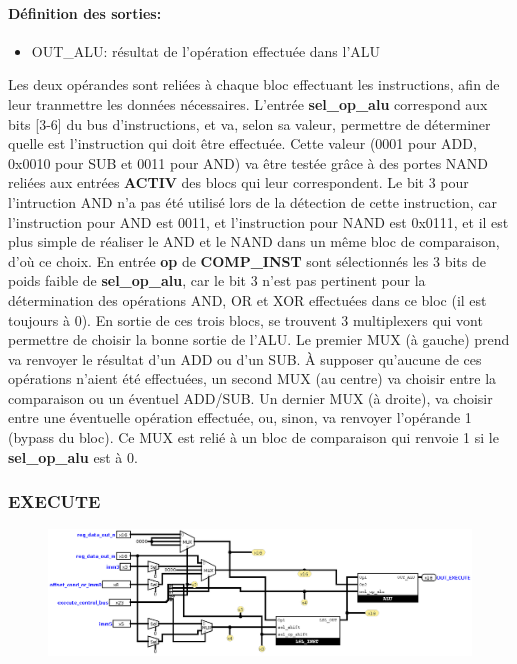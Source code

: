 \documentclass[a4paper]{article} %
\begin{document}
\paragraph{Définition des sorties:}
\begin{itemize}
    \item     OUT\_ALU: résultat de l'opération effectuée dans l'ALU
\end{itemize}
\medskip
Les deux opérandes sont reliées à chaque bloc effectuant les instructions, afin de leur tranmettre les données nécessaires. L'entrée \textbf{sel\_op\_alu} correspond aux bits [3-6] du bus d'instructions, et va, selon sa valeur, permettre de déterminer quelle est l'instruction qui doit être effectuée. Cette valeur (0001 pour ADD, 0x0010 pour SUB et 0011 pour AND) va être testée grâce à des portes NAND reliées aux entrées \textbf{ACTIV} des blocs qui leur correspondent. Le bit 3 pour l'intruction AND n'a pas été utilisé lors de la détection de cette instruction, car l'instruction pour AND est 0011, et l'instruction pour NAND est 0x0111, et il est plus simple de réaliser le AND et le NAND dans un même bloc de comparaison, d'où ce choix.
En entrée \textbf{op} de \textbf{COMP\_INST} sont sélectionnés les 3 bits de poids faible de \textbf{sel\_op\_alu}, car le bit 3 n'est pas pertinent pour la détermination des opérations AND, OR et XOR effectuées dans ce bloc (il est toujours à 0).
En sortie de ces trois blocs, se trouvent 3 multiplexers qui vont permettre de choisir la bonne sortie de l'ALU. Le premier MUX (à gauche) prend va renvoyer le résultat d'un ADD ou d'un SUB. À supposer qu'aucune de ces opérations n'aient été effectuées, un second MUX (au centre) va choisir entre la comparaison ou un éventuel ADD/SUB. Un dernier MUX (à droite), va choisir entre une éventuelle opération effectuée, ou, sinon, va renvoyer l'opérande 1 (bypass du bloc). Ce MUX est relié à un bloc de comparaison qui renvoie 1 si le \textbf{sel\_op\_alu} est à 0.
\subsubsection{EXECUTE} \label{execute}
\begin{figure}[H]
    \centering
    \includegraphics[width=1\textwidth]{src/EXECUTE.png}
    \label{fig:execute_pic}
\end{figure}
\end{document}
